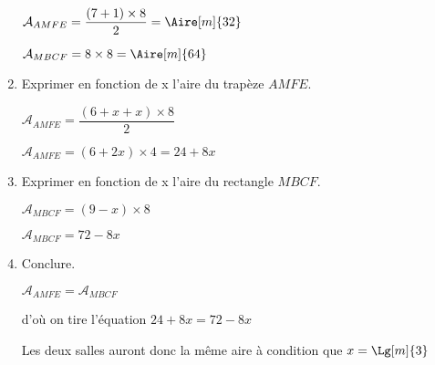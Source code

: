 \begin{corrige}
\begin{enumerate}
        {\color{red}$\mathcal{A}_{AMFE}=\dfrac{(7+1)\times 8}{2}=\Aire[m]{32}$
        
        $\mathcal{A}_{MBCF}=8\times 8=\Aire[m]{64}$}
        \item Exprimer en fonction de x l'aire du trapèze $AMFE$.
        
        {\color{red}
        $\mathcal{A}_{AMFE}=\dfrac{(6+x+x)\times 8}{2}$
        
        $\mathcal{A}_{AMFE}=(6+2x)\times4=24+8x$}
        \item Exprimer en fonction de x l'aire du rectangle $MBCF$.
        
        {\color{red}
        $\mathcal{A}_{MBCF}=(9-x)\times 8$
        
        $\mathcal{A}_{MBCF}=72-8x$}
    \end{enumerate}
    \Coupe
    \begin{enumerate}
        \setcounter{enumi}{3}
        \item Conclure.
        
        {\color{red}$\mathcal{A}_{AMFE}=\mathcal{A}_{MBCF}$
        
        d'où on tire l'équation $24+8x=72-8x$
        
        
        Les deux salles auront donc la même aire à condition que $x=\Lg[m]{3}$}
    \end{enumerate}
\end{corrige}

